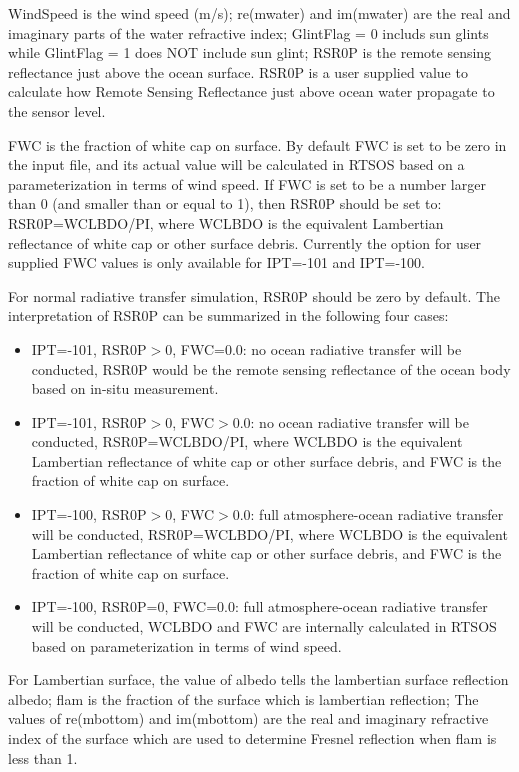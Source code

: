 \documentclass[10pt,letterpaper]{article}
\begin{document}
WindSpeed is the wind speed (m/s); re(mwater) and im(mwater) are the real and imaginary parts of the water refractive index; GlintFlag = 0 includs sun glints while  GlintFlag = 1 does NOT include sun glint; RSR0P is the remote sensing reflectance just above the ocean surface. RSR0P is a user supplied value to calculate how Remote Sensing Reflectance just above ocean water propagate to the sensor level. 

FWC is the fraction of white cap on surface. By default FWC is set to be zero in the input file, and its actual value will be calculated in RTSOS based on a parameterization in terms of wind speed. If FWC is set to be a number larger than 0 (and smaller than or equal to 1), then  RSR0P should be set to: RSR0P=WCLBDO/PI, where WCLBDO is the equivalent Lambertian reflectance of white cap or other surface debris. Currently the option for user supplied FWC values is only available for IPT=-101 and IPT=-100.

For normal radiative transfer simulation, RSR0P should be zero by default. The interpretation of RSR0P can be summarized in the following four cases: \\

\begin{itemize}
\item IPT=-101, RSR0P$>$0, FWC=0.0: no ocean radiative transfer will be conducted, RSR0P would be the remote sensing reflectance of the ocean body based on in-situ measurement. \\
\item  IPT=-101, RSR0P$>$0, FWC$>$0.0:  no ocean radiative transfer will be conducted, RSR0P=WCLBDO/PI, where WCLBDO is the equivalent Lambertian reflectance of white cap or other surface debris, and FWC is the fraction of white cap on surface. \\
\item  IPT=-100, RSR0P$>$0, FWC$>$0.0:  full atmosphere-ocean radiative transfer will be conducted, RSR0P=WCLBDO/PI, where WCLBDO is the equivalent Lambertian reflectance of white cap or other surface debris, and FWC is the fraction of white cap on surface. \\
\item  IPT=-100, RSR0P=0, FWC=0.0:  full atmosphere-ocean radiative transfer will be conducted, WCLBDO and FWC are internally calculated in RTSOS based on parameterization in terms of wind speed.
\end{itemize}

For Lambertian surface, the value of  albedo tells the lambertian surface reflection albedo;  flam is the fraction of the surface which is lambertian reflection; The values of re(mbottom) and im(mbottom) are the real and imaginary refractive index of the surface which are used to determine Fresnel reflection when flam is less than 1. 
\end{document}
